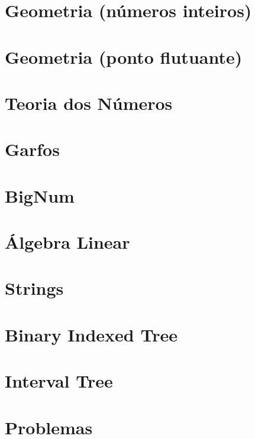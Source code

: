 \documentclass[oneside, landscape, twocolumn, a4wide, 9pt]{scrartcl}
\begin{document}
\section{Geometria (números inteiros)}


\section{Geometria (ponto flutuante)}


\section{Teoria dos Números}

\section{Garfos}


\section{BigNum}


\section{Álgebra Linear}


\section{Strings}


\section{Binary Indexed Tree}


\section{Interval Tree}


\section{Problemas}



\end{document}
